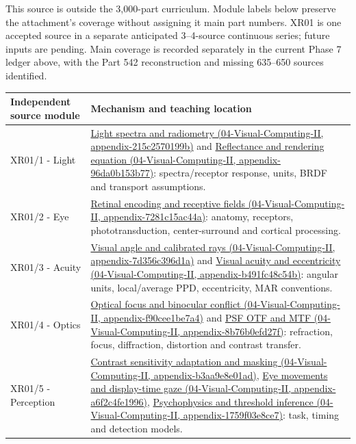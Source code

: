 This source is outside the 3,000-part curriculum. Module labels below preserve the attachment's coverage without assigning it main part numbers. XR01 is one accepted source in a separate anticipated 3--4-source continuous series; future inputs are pending. Main coverage is recorded separately in the current Phase 7 ledger above, with the Part 542 reconstruction and missing 635--650 sources identified.

{\def\LTcaptype{none} %
\begin{longtable}[]{@{}
  >{\raggedright\arraybackslash}p{}
  >{\raggedright\arraybackslash}p{}@{}}
\toprule\noalign{}
\begin{minipage}[b]{\linewidth}\raggedright
Independent source module
\end{minipage} & \begin{minipage}[b]{\linewidth}\raggedright
Mechanism and teaching location
\end{minipage} \\
\midrule\noalign{}
\endhead
\bottomrule\noalign{}
\endlastfoot
XR01/1 - Light & \href{}{Light spectra and radiometry (04-Visual-Computing-II, appendix-215c2570199b)} and \href{}{Reflectance and rendering equation (04-Visual-Computing-II, appendix-96da0b153b77)}: spectra/receptor response, units, BRDF and transport assumptions. \\
XR01/2 - Eye & \href{}{Retinal encoding and receptive fields (04-Visual-Computing-II, appendix-7281c15ac44a)}: anatomy, receptors, phototransduction, center-surround and cortical processing. \\
XR01/3 - Acuity & \href{}{Visual angle and calibrated rays (04-Visual-Computing-II, appendix-7d356c396d1a)} and \href{}{Visual acuity and eccentricity (04-Visual-Computing-II, appendix-b491fc48c54b)}: angular units, local/average PPD, eccentricity, MAR conventions. \\
XR01/4 - Optics & \href{}{Optical focus and binocular conflict (04-Visual-Computing-II, appendix-f90cee1be7a4)} and \href{}{PSF OTF and MTF (04-Visual-Computing-II, appendix-8b76b0efd27f)}: refraction, focus, diffraction, distortion and contrast transfer. \\
XR01/5 - Perception & \href{}{Contrast sensitivity adaptation and masking (04-Visual-Computing-II, appendix-b3aa9e8e01ad)}, \href{}{Eye movements and display-time gaze (04-Visual-Computing-II, appendix-a6f2c4fe1996)}, \href{}{Psychophysics and threshold inference (04-Visual-Computing-II, appendix-1759f03e8ce7)}: task, timing and detection models. \\

\end{longtable}}
